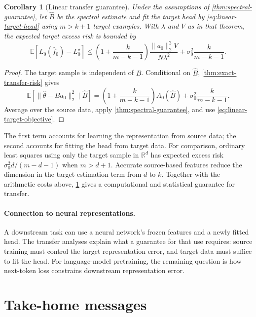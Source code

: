 \documentclass[11pt,twoside]{article}
\newcommand{\E}{\mathbb E}
\newcommand{\R}{\mathbb R}
\newtheorem{corollary}[theorem]{Corollary}
\theoremstyle{definition}
\theoremstyle{remark}
\begin{document}
\begin{corollary}[Linear transfer guarantee]
\label{cor:linear-transfer}
Under the assumptions of \cref{thm:spectral-guarantee}, let
$\widehat B$ be the spectral estimate and fit the target head by
\cref{eq:linear-target-head} using $m>k+1$ target examples.
With $\lambda$ and $V$ as in that theorem, the expected target excess risk is
bounded by
\begin{equation}
 \E[L_0(\widehat f_0)-L_0^\star]
 \le
 \left(1+\frac{k}{m-k-1}\right)
 \frac{\|a_0\|_2^2V}{N\lambda^2}
 +\sigma_0^2\frac{k}{m-k-1}.
 \label{eq:computational-transfer}
\end{equation}
\end{corollary}

\begin{proof}
The target sample is independent of $\widehat B$. Conditional on
$\widehat B$, \cref{thm:exact-transfer-risk} gives
\[
 \E[\|\widehat\theta-Ba_0\|_2^2\mid\widehat B]
 =\left(1+\frac{k}{m-k-1}\right)A_0(\widehat B)
  +\sigma_0^2\frac{k}{m-k-1}.
\]
Average over the source data, apply \cref{thm:spectral-guarantee}, and use
\cref{eq:linear-target-objective}.
\end{proof}

The first term accounts for learning the representation from source data;
the second accounts for fitting the head from target data. For comparison,
ordinary least squares using only the target sample in $\R^d$ has expected
excess risk $\sigma_0^2d/(m-d-1)$ when $m>d+1$. Accurate source-based
features reduce the dimension in the target estimation term from $d$ to $k$.
Together with the arithmetic costs above, \cref{cor:linear-transfer} gives a
computational and statistical guarantee for transfer.

\paragraph{Connection to neural representations.}
A downstream task can use a neural network's frozen features and a newly
fitted head. The transfer analyses explain what a guarantee for that use
requires: source training must control the target representation error, and
target data must suffice to fit the head. For language-model pretraining,
the remaining question is how next-token loss constrains downstream
representation error.

\clearpage
\section{Take-home messages}
\end{document}
